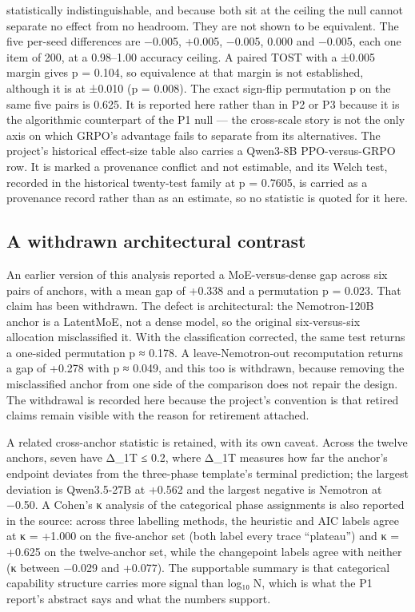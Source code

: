 \documentclass[12pt,a4paper]{report}
\begin{document}
statistically indistinguishable, and because both sit at the ceiling the
null cannot separate no effect from no headroom. They are not shown to
be equivalent. The five per-seed differences are −0.005, +0.005, −0.005,
0.000 and −0.005, each one item of 200, at a 0.98--1.00 accuracy
ceiling. A paired TOST with a ±0.005 margin gives p = 0.104, so
equivalence at that margin is not established, although it is at ±0.010
(p = 0.008). The exact sign-flip permutation p on the same five pairs is
0.625. It is reported here rather than in P2 or P3 because it is the
algorithmic counterpart of the P1 null --- the cross-scale story is not
the only axis on which GRPO's advantage fails to separate from its
alternatives. The project's historical effect-size table also carries a
Qwen3-8B PPO-versus-GRPO row. It is marked a provenance conflict and not
estimable, and its Welch test, recorded in the historical twenty-test
family at p = 0.7605, is carried as a provenance record rather than as
an estimate, so no statistic is quoted for it here.

\subsection{A withdrawn architectural
contrast}\label{a-withdrawn-architectural-contrast}

An earlier version of this analysis reported a MoE-versus-dense gap
across six pairs of anchors, with a mean gap of +0.338 and a permutation
p = 0.023. That claim has been withdrawn. The defect is architectural:
the Nemotron-120B anchor is a LatentMoE, not a dense model, so the
original six-versus-six allocation misclassified it. With the
classification corrected, the same test returns a one-sided permutation
p ≈ 0.178. A leave-Nemotron-out recomputation returns a gap of +0.278
with p ≈ 0.049, and this too is withdrawn, because removing the
misclassified anchor from one side of the comparison does not repair the
design. The withdrawal is recorded here because the project's convention
is that retired claims remain visible with the reason for retirement
attached.

A related cross-anchor statistic is retained, with its own caveat.
Across the twelve anchors, seven have \textbar Δ\_1T\textbar{} ≤ 0.2,
where Δ\_1T measures how far the anchor's endpoint deviates from the
three-phase template's terminal prediction; the largest deviation is
Qwen3.5-27B at +0.562 and the largest negative is Nemotron at −0.50. A
Cohen's κ analysis of the categorical phase assignments is also reported
in the source: across three labelling methods, the heuristic and AIC
labels agree at κ = +1.000 on the five-anchor set (both label every
trace ``plateau'') and κ = +0.625 on the twelve-anchor set, while the
changepoint labels agree with neither (κ between −0.029 and +0.077). The
supportable summary is that categorical capability structure carries
more signal than log₁₀ N, which is what the P1 report's abstract says
and what the numbers support.
\end{document}
